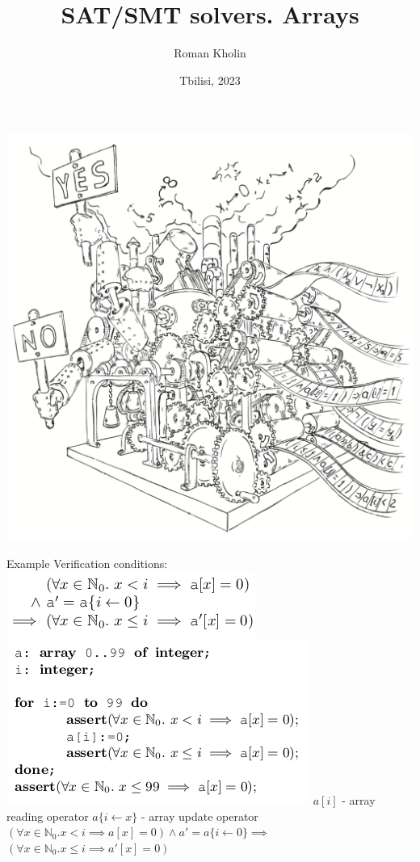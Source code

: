 \documentclass{beamer}
\begin{document}
\title{SAT/SMT solvers. Arrays}
\author{Roman Kholin}
\date{Tbilisi, 2023}

\begin{frame}
\includegraphics[scale=0.5]{../decision-procedure.png}
\end{frame}

\frame{\titlepage}

\begin{frame}{Example}
Verification conditions:\newline
\includegraphics[scale=0.5]{conditions.png}
\includegraphics[scale=0.5]{code.png}\newline
$a[i]$ - array reading operator\newline
$a\{i\leftarrow x\}$ - array update operator\newline
$(\forall x \in \mathbb{N}_0. x < i \implies a[x] = 0) \wedge a' = a\{i\leftarrow 0\} \implies$\newline
$(\forall x \in \mathbb{N}_0. x \le i \implies a'[x] = 0)$
\end{frame}
\end{document}
